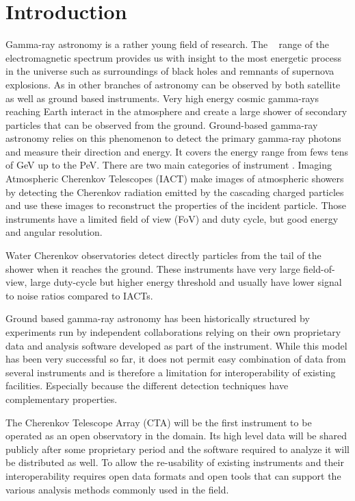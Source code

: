 \section{Introduction}
\label{sec:introduction}


Gamma-ray astronomy is a rather young field of research. The \gammaray~
range of the electromagnetic spectrum provides us with insight to the
most energetic process in the universe such as surroundings of
black holes and remnants of supernova explosions. As in other
branches of astronomy \gammarays can be observed by both
satellite as well as ground based instruments.
Very high energy cosmic gamma-rays reaching Earth interact in the atmosphere and
create a large shower of secondary particles that can be observed from the ground.
Ground-based gamma-ray astronomy relies on this phenomenon to detect the
primary gamma-ray photons and measure their direction and energy.
It covers the energy range from fews tens of GeV up to the PeV.
There are two main categories of instrument \citep{2015CRPhy..16..610D}.
Imaging Atmospheric Cherenkov Telescopes (IACT) make images of atmospheric showers
by detecting the Cherenkov radiation emitted by the cascading charged particles and
use these images to reconstruct the properties of the incident particle.
Those instruments have a limited field of view (FoV) and duty cycle, but
good energy and angular resolution.

Water Cherenkov observatories detect directly particles from the tail of the
shower when it reaches the ground. These instruments have very
large field-of-view, large duty-cycle but higher energy threshold and
usually have lower signal to noise ratios compared to IACTs.

Ground based gamma-ray astronomy has been historically structured
by experiments run by independent collaborations relying
on their own proprietary data and analysis software developed as part of the
instrument. While this model has been very successful so far, it does not
permit easy combination of data from several instruments and is therefore
a limitation for interoperability of existing facilities. Especially
because the different detection techniques have complementary
properties.

The Cherenkov Telescope Array (CTA) will be the first instrument to be operated
as an open observatory in the domain. Its high level data will be shared publicly after
some proprietary period and the software required to analyze it will be distributed
as well. To allow the re-usability of existing instruments and their interoperability
requires open data formats and open tools that can support the various analysis methods
commonly used in the field.

